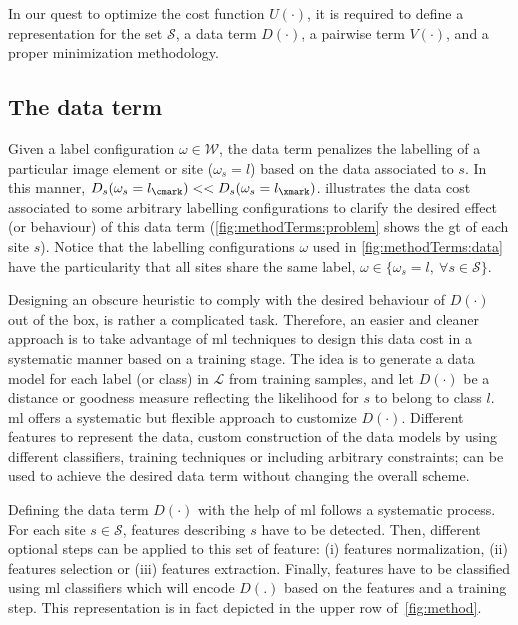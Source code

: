 {\color{red}In our quest to optimize the cost function $U(\cdot)$, it is required to define a representation for the set $\mathcal{S}$, a data term $D(\cdot)$, a pairwise term $V(\cdot)$, and a proper minimization methodology.}

\subsection{The data term} \label{sec:method:dataTerm}

Given a label configuration $\omega \in \mathcal{W}$, the data term penalizes the labelling of a particular image element or site ($\omega_s = l$) based on the data associated to $s$.
In this manner, $D_s(\omega_s=l_\cmark) << D_s(\omega_s=l_\xmark)$.
 illustrates the data cost associated to some arbitrary labelling configurations to clarify the desired effect (or behaviour) of this data term (\cref{fig:methodTerms:problem} shows the \ac{gt} of each site $s$).
Notice that the labelling configurations $\omega$ used in \cref{fig:methodTerms:data} have the particularity that all sites share the same label, $\omega \in \{ \omega_s=l,~\forall s\in\mathcal{S}\}$.

Designing an obscure heuristic to comply with the desired behaviour of $D(\cdot)$ out of the box, is rather a complicated task.
Therefore, an easier and cleaner approach is to take advantage of \ac{ml} techniques to design this data cost in a systematic manner based on a training stage. 
The idea is to generate a data model for each label (or class) in $\mathcal{L}$ from training samples, and let $D(\cdot)$ be a distance or goodness measure reflecting the likelihood for $s$ to belong to class $l$.
\ac{ml} offers a systematic but flexible approach to customize $D(\cdot)$.
Different features to represent the data, custom construction of the data models by using different classifiers, training techniques or including arbitrary constraints; can be used to achieve the desired data term without changing the overall scheme. 

{\color{red} Defining the data term $D(\cdot)$ with the help of \ac{ml} follows a systematic process. For each site $s \in \mathcal{S}$, features describing $s$ have to be detected. Then, different optional steps can be applied to this set of feature: (i) features normalization, (ii) features selection or (iii) features extraction. Finally, features have to be classified using \ac{ml} classifiers which will encode $D(.)$ based on the features and a training step. This representation is in fact depicted in the upper row of~\cref{fig:method}.}

